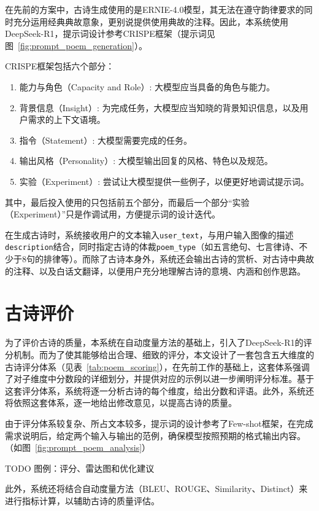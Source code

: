 在先前的方案中，古诗生成使用的是ERNIE-4.0模型，其无法在遵守韵律要求的同时充分运用经典典故意象，更别说提供使用典故的注释。因此，本系统使用DeepSeek-R1\cite{deepseek-aiDeepSeekR1IncentivizingReasoning2025}，提示词设计参考CRISPE框架（提示词见图~\ref{fig:prompt_poem_generation}）。

CRISPE框架包括六个部分：
\begin{enumerate}
  \item 能力与角色（Capacity and Role）: 大模型应当具备的角色与能力。
  \item 背景信息（Insight）: 为完成任务，大模型应当知晓的背景知识信息，以及用户需求的上下文语境。
  \item 指令（Statement）: 大模型需要完成的任务。
  \item 输出风格（Personality）: 大模型输出回复的风格、特色以及规范。
  \item 实验（Experiment）: 尝试让大模型提供一些例子，以便更好地调试提示词。
\end{enumerate}

其中，最后投入使用的只包括前五个部分，而最后一个部分“实验（Experiment）”只是作调试用，方便提示词的设计迭代。

在生成古诗时，系统接收用户的文本输入\verb|user_text|，与用户输入图像的描述\verb|description|结合，同时指定古诗的体裁\verb|poem_type|（如五言绝句、七言律诗、不少于8句的排律等）。而除了古诗本身外，系统还会输出古诗的赏析、对古诗中典故的注释、以及白话文翻译，以便用户充分地理解古诗的意境、内涵和创作思路。


\section{古诗评价}

为了评价古诗的质量，本系统在自动度量方法的基础上，引入了DeepSeek-R1的评分机制。而为了使其能够给出合理、细致的评分，本文设计了一套包含五大维度的古诗评分体系（见表~\ref{tab:poem_scoring}），在先前工作的基础上，这套体系强调了对子维度中分数段的详细划分，并提供对应的示例以进一步阐明评分标准。基于这套评分体系，系统将逐一分析古诗的每个维度，给出分数和评语。此外，系统还将依照这套体系，逐一地给出修改意见，以提高古诗的质量。

由于评分体系较复杂、所占文本较多，提示词的设计参考了Few-shot框架\cite{brownLanguageModelsAre2020}，在完成需求说明后，给定两个输入与输出的范例，确保模型按照预期的格式输出内容。（如图~\ref{fig:prompt_poem_analysis}）

TODO 图例：评分、雷达图和优化建议

此外，系统还将结合自动度量方法（BLEU、ROUGE、Similarity、Distinct）来进行指标计算，以辅助古诗的质量评估。


